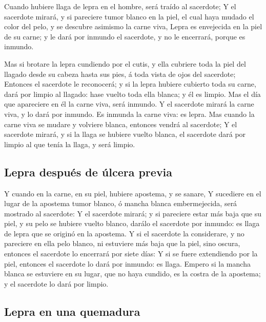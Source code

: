  Cuando hubiere llaga de lepra en el hombre, será traído al
sacerdote;  Y el sacerdote mirará, y si pareciere tumor
blanco en la piel, el cual haya mudado el color del pelo, y se descubre
asimismo la carne viva,  Lepra es envejecida en la piel de
su carne; y le dará por inmundo el sacerdote, y no le encerrará, porque
es inmundo.

 Mas si brotare la lepra cundiendo por el cutis, y ella
cubriere toda la piel del llagado desde su cabeza hasta sus pies, á toda
vista de ojos del sacerdote;  Entonces el sacerdote le
reconocerá; y si la lepra hubiere cubierto toda su carne, dará por
limpio al llagado: hase vuelto toda ella blanca; y él es limpio.
 Mas el día que apareciere en él la carne viva, será
inmundo.  Y el sacerdote mirará la carne viva, y lo dará
por inmundo. Es inmunda la carne viva: es lepra.  Mas
cuando la carne viva se mudare y volviere blanca, entonces vendrá al
sacerdote;  Y el sacerdote mirará, y si la llaga se hubiere
vuelto blanca, el sacerdote dará por limpio al que tenía la llaga, y
será limpio.

\hypertarget{lepra-despuuxe9s-de-uxfalcera-previa}{%
\subsection{Lepra después de úlcera
previa}\label{lepra-despuuxe9s-de-uxfalcera-previa}}

 Y cuando en la carne, en su piel, hubiere apostema, y se
sanare,  Y sucediere en el lugar de la apostema tumor
blanco, ó mancha blanca embermejecida, será mostrado al sacerdote:
 Y el sacerdote mirará; y si pareciere estar más baja que
su piel, y su pelo se hubiere vuelto blanco, darálo el sacerdote por
inmundo: es llaga de lepra que se originó en la apostema. 
Y si el sacerdote la considerare, y no pareciere en ella pelo blanco, ni
estuviere más baja que la piel, sino oscura, entonces el sacerdote lo
encerrará por siete días:  Y si se fuere extendiendo por la
piel, entonces el sacerdote lo dará por inmundo: es llaga. 
Empero si la mancha blanca se estuviere en su lugar, que no haya
cundido, es la costra de la apostema; y el sacerdote lo dará por limpio.

\hypertarget{lepra-en-una-quemadura}{%
\subsection{Lepra en una quemadura}\label{lepra-en-una-quemadura}}

